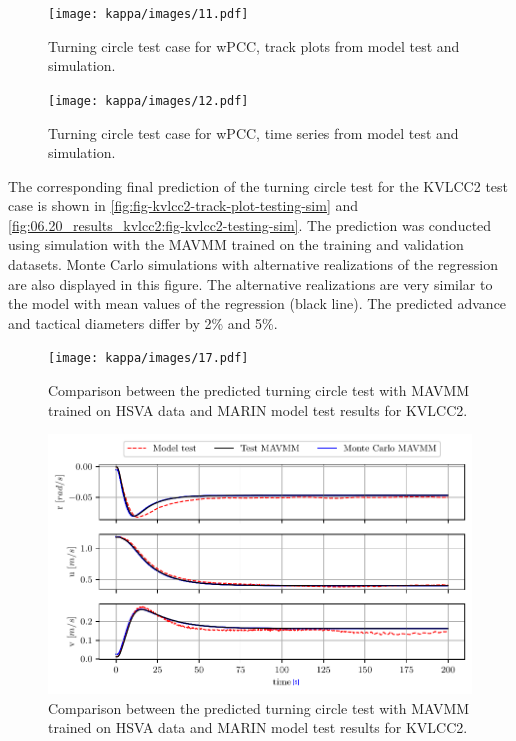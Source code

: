 \begin{figure}[h]
\centering
\texttt{[image: kappa/images/11.pdf]}
\caption{Turning circle test case for wPCC, track plots from model test and simulation.}\label{fig:track-plot-testing-sim}
\end{figure}
\begin{figure}[ht]
\centering
\texttt{[image: kappa/images/12.pdf]}
\caption{Turning circle test case for wPCC, time series from model test and simulation.}\label{\detokenize{06.10_results_wpcc:fig-testing-sim}}\end{figure}
\FloatBarrier

The corresponding final prediction of the turning circle test for the KVLCC2 test case is shown in \autoref{fig:fig-kvlcc2-track-plot-testing-sim} and \autoref{fig:06.20_results_kvlcc2:fig-kvlcc2-testing-sim}. The prediction was conducted using simulation with the MAVMM trained on the training and validation datasets. Monte Carlo simulations with alternative realizations of the regression are also displayed in this figure. The alternative realizations are very similar to the model with mean values of the regression (black line).
The predicted advance and tactical diameters differ by 2\% and 5\%.
\begin{figure}[h!]
\centering
\texttt{[image: kappa/images/17.pdf]}
\caption{Comparison between the predicted turning circle test with MAVMM trained on HSVA data and MARIN model test results for KVLCC2.}\label{fig:fig-kvlcc2-track-plot-testing-sim}\end{figure}
\begin{figure}[h!]
\centering
\includegraphics[width=1.0\textwidth]{kappa/images/18.pdf}
\caption{Comparison between the predicted turning circle test with MAVMM trained on HSVA data and MARIN model test results for KVLCC2.}\label{fig:06.20_results_kvlcc2:fig-kvlcc2-testing-sim}\end{figure}
\clearpage